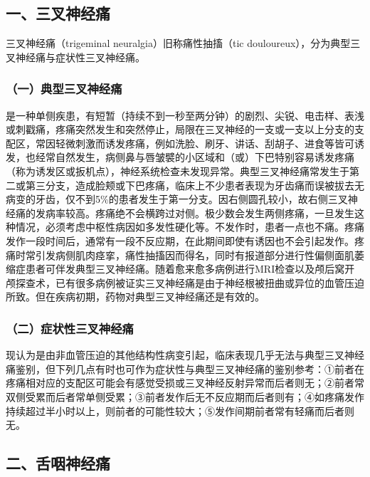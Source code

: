 \subsection{一、三叉神经痛}

三叉神经痛（trigeminal neuralgia）旧称痛性抽搐（tic
douloureux），分为典型三叉神经痛与症状性三叉神经痛。

\subsubsection{（一）典型三叉神经痛}

是一种单侧疾患，有短暂（持续不到一秒至两分钟）的剧烈、尖锐、电击样、表浅或刺戳痛，疼痛突然发生和突然停止，局限在三叉神经的一支或一支以上分支的支配区，常因轻微刺激而诱发疼痛，例如洗脸、刷牙、讲话、刮胡子、进食等皆可诱发，也经常自然发生，病侧鼻与唇皱襞的小区域和（或）下巴特别容易诱发疼痛（称为诱发区或扳机点），神经系统检查未发现异常。典型三叉神经痛常发生于第二或第三分支，造成脸颊或下巴疼痛，临床上不少患者表现为牙齿痛而误被拔去无病变的牙齿，仅不到5\%的患者发生于第一分支。因右侧圆孔较小，故右侧三叉神经痛的发病率较高。疼痛绝不会横跨过对侧。极少数会发生两侧疼痛，一旦发生这种情况，必须考虑中枢性病因如多发性硬化等。不发作时，患者一点也不痛。疼痛发作一段时间后，通常有一段不反应期，在此期间即使有诱因也不会引起发作。疼痛时常引发病侧肌肉痉挛，痛性抽搐因而得名，同时有报道部分进行性偏侧面肌萎缩症患者可伴发典型三叉神经痛。随着愈来愈多病例进行MRI检查以及颅后窝开颅探查术，已有很多病例被证实三叉神经痛是由于神经根被扭曲或异位的血管压迫所致。但在疾病初期，药物对典型三叉神经痛还是有效的。

\subsubsection{（二）症状性三叉神经痛}

现认为是由非血管压迫的其他结构性病变引起，临床表现几乎无法与典型三叉神经痛鉴别，但下列几点有时也可作为症状性与典型三叉神经痛的鉴别参考：①前者在疼痛相对应的支配区可能会有感觉受损或三叉神经反射异常而后者则无；②前者常双侧受累而后者常单侧受累；③前者发作后无不反应期而后者则有；④如疼痛发作持续超过半小时以上，则前者的可能性较大；⑤发作间期前者常有轻痛而后者则无。

\protect\hypertarget{text00354.html}{}{}

\subsection{二、舌咽神经痛}

